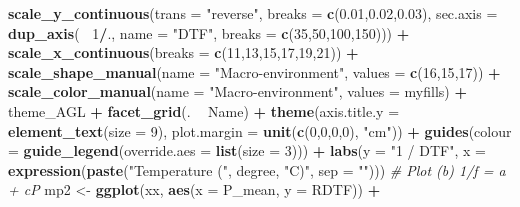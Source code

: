 \documentclass[
]{article}
\newenvironment{Shaded}{\begin{snugshade}}{\end{snugshade}}
\newcommand{\CommentTok}[1]{\textcolor[rgb]{0.56,0.35,0.01}{\textit{#1}}}
\newcommand{\DataTypeTok}[1]{\textcolor[rgb]{0.13,0.29,0.53}{#1}}
\newcommand{\DecValTok}[1]{\textcolor[rgb]{0.00,0.00,0.81}{#1}}
\newcommand{\FloatTok}[1]{\textcolor[rgb]{0.00,0.00,0.81}{#1}}
\newcommand{\KeywordTok}[1]{\textcolor[rgb]{0.13,0.29,0.53}{\textbf{#1}}}
\newcommand{\NormalTok}[1]{#1}
\newcommand{\OperatorTok}[1]{\textcolor[rgb]{0.81,0.36,0.00}{\textbf{#1}}}
\newcommand{\StringTok}[1]{\textcolor[rgb]{0.31,0.60,0.02}{#1}}
\begin{document}
\begin{Shaded}
\begin{Highlighting}[]
{{{{{\StringTok{  }\KeywordTok{scale_y_continuous}\NormalTok{(}\DataTypeTok{trans =} \StringTok{"reverse"}\NormalTok{, }\DataTypeTok{breaks =} \KeywordTok{c}\NormalTok{(}\FloatTok{0.01}\NormalTok{,}\FloatTok{0.02}\NormalTok{,}\FloatTok{0.03}\NormalTok{),}
        \DataTypeTok{sec.axis =} \KeywordTok{dup_axis}\NormalTok{(}\OperatorTok{~}\StringTok{ }\DecValTok{1}\OperatorTok{/}\NormalTok{., }\DataTypeTok{name =} \StringTok{"DTF"}\NormalTok{, }\DataTypeTok{breaks =} \KeywordTok{c}\NormalTok{(}\DecValTok{35}\NormalTok{,}\DecValTok{50}\NormalTok{,}\DecValTok{100}\NormalTok{,}\DecValTok{150}\NormalTok{))) }\OperatorTok{+}
\StringTok{  }\KeywordTok{scale_x_continuous}\NormalTok{(}\DataTypeTok{breaks =} \KeywordTok{c}\NormalTok{(}\DecValTok{11}\NormalTok{,}\DecValTok{13}\NormalTok{,}\DecValTok{15}\NormalTok{,}\DecValTok{17}\NormalTok{,}\DecValTok{19}\NormalTok{,}\DecValTok{21}\NormalTok{)) }\OperatorTok{+}
\StringTok{  }\KeywordTok{scale_shape_manual}\NormalTok{(}\DataTypeTok{name =} \StringTok{"Macro-environment"}\NormalTok{, }\DataTypeTok{values =} \KeywordTok{c}\NormalTok{(}\DecValTok{16}\NormalTok{,}\DecValTok{15}\NormalTok{,}\DecValTok{17}\NormalTok{)) }\OperatorTok{+}
\StringTok{  }\KeywordTok{scale_color_manual}\NormalTok{(}\DataTypeTok{name =} \StringTok{"Macro-environment"}\NormalTok{, }\DataTypeTok{values =}\NormalTok{ myfills) }\OperatorTok{+}
\StringTok{  }\NormalTok{theme_AGL }\OperatorTok{+}\StringTok{ }\KeywordTok{facet_grid}\NormalTok{(. }\OperatorTok{~}\StringTok{ }\NormalTok{Name) }\OperatorTok{+}\StringTok{ }
\StringTok{  }\KeywordTok{theme}\NormalTok{(}\DataTypeTok{axis.title.y =} \KeywordTok{element_text}\NormalTok{(}\DataTypeTok{size =} \DecValTok{9}\NormalTok{),}
        \DataTypeTok{plot.margin =} \KeywordTok{unit}\NormalTok{(}\KeywordTok{c}\NormalTok{(}\DecValTok{0}\NormalTok{,}\DecValTok{0}\NormalTok{,}\DecValTok{0}\NormalTok{,}\DecValTok{0}\NormalTok{), }\StringTok{"cm"}\NormalTok{)) }\OperatorTok{+}
\StringTok{  }\KeywordTok{guides}\NormalTok{(}\DataTypeTok{colour =} \KeywordTok{guide_legend}\NormalTok{(}\DataTypeTok{override.aes =} \KeywordTok{list}\NormalTok{(}\DataTypeTok{size =} \DecValTok{3}\NormalTok{))) }\OperatorTok{+}
\StringTok{  }\KeywordTok{labs}\NormalTok{(}\DataTypeTok{y =} \StringTok{"1 / DTF"}\NormalTok{, }\DataTypeTok{x =} \KeywordTok{expression}\NormalTok{(}\KeywordTok{paste}\NormalTok{(}\StringTok{"Temperature ("}\NormalTok{, degree, }\StringTok{"C)"}\NormalTok{, }\DataTypeTok{sep =} \StringTok{""}\NormalTok{)))}
\CommentTok{# Plot (b) 1/f = a + cP}
\NormalTok{mp2 <-}\StringTok{ }\KeywordTok{ggplot}\NormalTok{(xx, }\KeywordTok{aes}\NormalTok{(}\DataTypeTok{x =}\NormalTok{ P_mean, }\DataTypeTok{y =}\NormalTok{ RDTF)) }\OperatorTok{+}
}}}}}
\end{Highlighting}
\end{Shaded}
\end{document}
